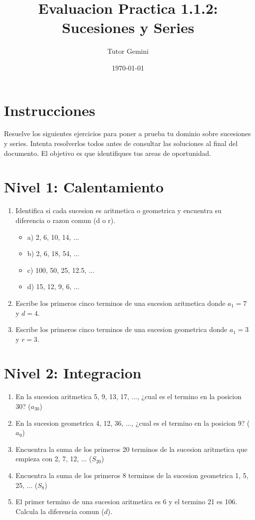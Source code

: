 \documentclass[12pt,a4paper]{article}
\title{\textbf{\Large Evaluacion Practica 1.1.2: Sucesiones y Series}}
\author{Tutor Gemini}
\date{\today}
\begin{document}
\maketitle

\section*{Instrucciones}
Resuelve los siguientes ejercicios para poner a prueba tu dominio sobre sucesiones y series. Intenta resolverlos todos antes de consultar las soluciones al final del documento. El objetivo es que identifiques tus areas de oportunidad.

\section*{Nivel 1: Calentamiento}
\begin{enumerate}
    \item Identifica si cada sucesion es aritmetica o geometrica y encuentra su diferencia o razon comun (d o r).
    \begin{itemize}
        \item a) 2, 6, 10, 14, ...
        \item b) 2, 6, 18, 54, ...
        \item c) 100, 50, 25, 12.5, ...
        \item d) 15, 12, 9, 6, ...
    \end{itemize}
    \item Escribe los primeros cinco terminos de una sucesion aritmetica donde $a_1 = 7$ y $d = 4$.
    \item Escribe los primeros cinco terminos de una sucesion geometrica donde $a_1 = 3$ y $r = 3$.
\end{enumerate}

\section*{Nivel 2: Integracion}
\begin{enumerate}
    \item En la sucesion aritmetica 5, 9, 13, 17, ..., ¿cual es el termino en la posicion 30? ($a_{30}$)
    \item En la sucesion geometrica 4, 12, 36, ..., ¿cual es el termino en la posicion 9? ($a_9$)
    \item Encuentra la suma de los primeros 20 terminos de la sucesion aritmetica que empieza con 2, 7, 12, ... ($S_{20}$)
    \item Encuentra la suma de los primeros 8 terminos de la sucesion geometrica 1, 5, 25, ... ($S_8$)
    \item El primer termino de una sucesion aritmetica es 6 y el termino 21 es 106. Calcula la diferencia comun ($d$).
\end{enumerate}
\end{document}
